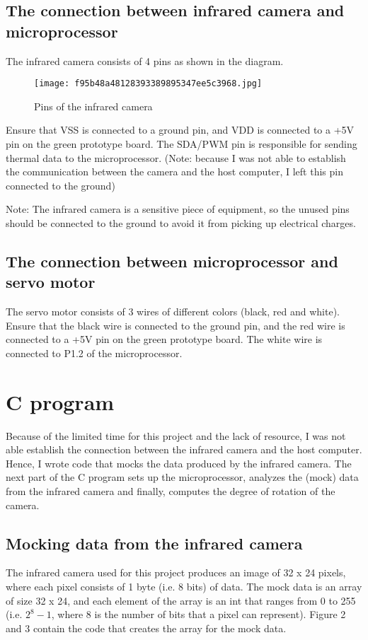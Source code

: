 \documentclass[12pt]{article}
\begin{document}
\subsection {The connection between infrared camera and microprocessor}
The infrared camera consists of 4 pins as shown in the diagram.

\begin{figure}[h]
\texttt{[image: f95b48a48128393389895347ee5c3968.jpg]}
\centering
\caption{Pins of the infrared camera}
\end{figure}

Ensure that VSS is connected to a ground pin, and VDD is connected to a +5V pin on the green prototype board. The SDA/PWM pin is responsible for sending thermal data to the microprocessor. (Note: because I was not able to establish the communication between the camera and the host computer, I left this pin connected to the ground)

Note: The infrared camera is a sensitive piece of equipment, so the unused pins should be connected to the ground to avoid it from picking up electrical charges. 

\subsection {The connection between microprocessor and servo motor}
The servo motor consists of 3 wires of different colors (black, red and white). Ensure that the black wire is connected to the ground pin, and the red wire is connected to a +5V pin on the green prototype board. The white wire is connected to P1.2 of the microprocessor.

\section {C program}
Because of the limited time for this project and the lack of resource, I was not able establish the connection between the infrared camera and the host computer. Hence, I wrote code that mocks the data produced by the infrared camera. The next part of the C program sets up the microprocessor, analyzes the (mock) data from the infrared camera and finally, computes the degree of rotation of the camera.

\subsection {Mocking data from the infrared camera}
The infrared camera used for this project produces an image of 32 x 24 pixels, where each pixel consists of 1 byte (i.e. 8 bits) of data. The mock data is an array of size 32 x 24, and each element of the array is an int that ranges from 0 to 255 (i.e. $2^8 - 1$, where 8 is the number of bits that a pixel can represent). Figure 2 and 3 contain the code that creates the array for the mock data.
\end{document}
